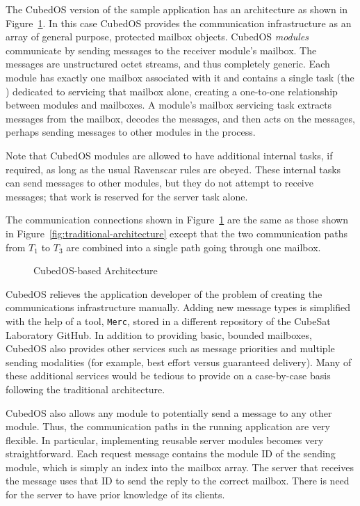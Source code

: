 The CubedOS version of the sample application has an architecture as shown in
Figure~\ref{fig:cubedos-architecture}. In this case CubedOS provides the communication
infrastructure as an array of general purpose, protected mailbox objects. CubedOS
\textit{modules} communicate by sending messages to the receiver module's mailbox. The messages
are unstructured octet streams, and thus completely generic. Each module has exactly one mailbox
associated with it and contains a single task (the ) dedicated to servicing
that mailbox alone, creating a one-to-one relationship between modules and mailboxes. A module's
mailbox servicing task extracts messages from the mailbox, decodes the messages, and then acts
on the messages, perhaps sending messages to other modules in the process.

Note that CubedOS modules are allowed to have additional internal tasks, if required, as long as
the usual Ravenscar rules are obeyed. These internal tasks can send messages to other modules,
but they do not attempt to receive messages; that work is reserved for the server task alone.

The communication connections shown in Figure~\ref{fig:cubedos-architecture} are the same as
those shown in Figure~\ref{fig:traditional-architecture} except that the two communication paths
from $T_1$ to $T_3$ are combined into a single path going through one mailbox.

\begin{figure}[tbhp]
  \center
  \caption{CubedOS-based Architecture}
  \label{fig:cubedos-architecture}
\end{figure}

CubedOS relieves the application developer of the problem of creating the communications
infrastructure manually. Adding new message types is simplified with the help of a tool,
\texttt{Merc}, stored in a different repository of the CubeSat Laboratory GitHub. In addition to
providing basic, bounded mailboxes, CubedOS also provides other services such as message
priorities and multiple sending modalities (for example, best effort versus guaranteed
delivery).  Many
of these additional services would be tedious to provide on a case-by-case basis following the
traditional architecture.

CubedOS also allows any module to potentially send a message to any other module. Thus, the
communication paths in the running application are very flexible. In particular, implementing
reusable server modules becomes very straightforward. Each request message contains the module
ID of the sending module, which is simply an index into the mailbox array. The server that
receives the message uses that ID to send the reply to the correct mailbox. There is need for
the server to have prior knowledge of its clients.

